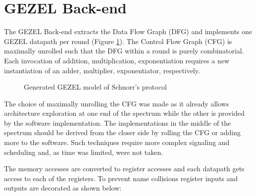\section{GEZEL Back-end}

The GEZEL Back-end extracts the Data Flow Graph (DFG) and implements
one GEZEL datapath per round (Figure \ref{fig:gezel_backend}). The
Control Flow Graph (CFG) is maximally unrolled such that the DFG
within a round is purely combinatorial. Each invocation of addition,
multiplication, exponentiation requires a new instantiation of an
adder, multiplier, exponentiator, respectively.


\begin{figure}[hb!]
  \centering
  \caption{Generated GEZEL model of Schnorr's protocol}
  \label{fig:gezel_backend}
\end{figure}

The choice of maximally unrolling the CFG was made as it already
allows architecture exploration at one end of the spectrum while the
other is provided by the software implementation. The implementations
in the middle of the spectrum should be derived from the closer side
by rolling the CFG or adding more to the software. Such techniques
require more complex signaling and scheduling and, as time was
limited, were not taken.

The memory accesses are converted to register accesses and each
datapath gets access to each of the registers. To prevent name collisions
register inputs and outputs are decorated as shown below:

